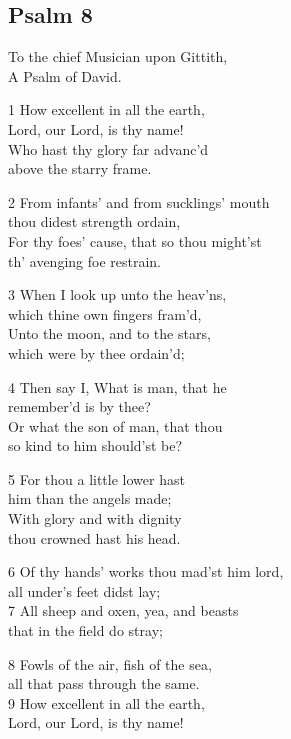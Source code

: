 \subsection*{Psalm 8 }


To the chief Musician upon Gittith,\\
A Psalm of David.

1 How excellent in all the earth,\\
Lord, our Lord, is thy name!\\
Who hast thy glory far advanc’d\\
above the starry frame.

2 From infants’ and from sucklings’ mouth\\
thou didest strength ordain,\\
For thy foes’ cause, that so thou might’st\\
th’ avenging foe restrain.

3 When I look up unto the heav’ns,\\
which thine own fingers fram’d,\\
Unto the moon, and to the stars,\\
which were by thee ordain’d;

4 Then say I, What is man, that he\\
remember’d is by thee?\\
Or what the son of man, that thou\\
so kind to him should’st be?

5 For thou a little lower hast\\
him than the angels made;\\
With glory and with dignity\\
thou crowned hast his head.

6 Of thy hands’ works thou mad’st him lord,\\
all under’s feet didst lay;\\
7 All sheep and oxen, yea, and beasts\\
that in the field do stray;

8 Fowls of the air, fish of the sea,\\
all that pass through the same.\\
9 How excellent in all the earth,\\
Lord, our Lord, is thy name!

\begin{center}
\quad{}\quad{}
\end{center}

